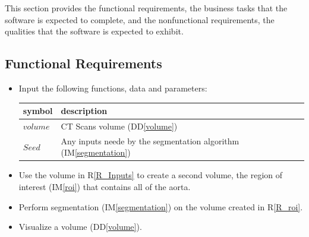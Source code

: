 \documentclass[12pt]{article}
\newcommand{\ddref}[1]{DD\ref{#1}}
\newcommand{\iref}[1]{IM\ref{#1}}
\newcounter{reqnum} %
\newcommand{\rref}[1]{R\ref{#1}}
\begin{document}
This section provides the functional requirements, the business tasks that the
software is expected to complete, and the nonfunctional requirements, the
qualities that the software is expected to exhibit.

\subsection{Functional Requirements}

\noindent \begin{itemize}
\item[R\refstepcounter{reqnum}\thereqnum \label{R_Inputs}:] Input the following
  functions, data and parameters:
  \renewcommand{\arraystretch}{1.2}
  \noindent \begin{longtable*}{l l p{12cm}} \toprule
         \textbf{symbol}  & \textbf{description}\\
         \midrule 
$volume$ & CT Scans volume
(\ddref{volume})\\ %
$Seed$ & Any inputs neede by the segmentation algorithm (\iref{segmentation})\\
         \bottomrule
\end{longtable*}

\item[R\refstepcounter{reqnum}\thereqnum \label{R_roi}:] Use the volume in \rref{R_Inputs} to create a second volume, the region of interest (\iref{roi}) that contains all of the aorta.

\item[R\refstepcounter{reqnum}\thereqnum \label{R_output}:] Perform segmentation (\iref{segmentation}) on the volume created in \rref{R_roi}.

\item[R\refstepcounter{reqnum}\thereqnum \label{R_visualize}:] Visualize a volume (\ddref{volume}).


\end{itemize}
\end{document}

